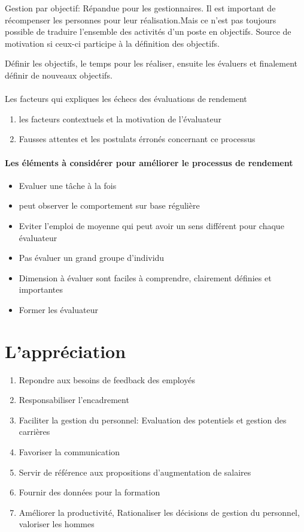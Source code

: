 
Gestion par objectif: Répandue pour les gestionnaires. Il est important de récompenser les personnes pour leur réalisation.Mais ce n'est pas toujours possible de traduire l'ensemble des activités d'un poste en objectifs. 
Source de motivation si ceux-ci participe à la définition des objectifs. 

Définir les objectifs, le temps pour les réaliser, ensuite les évaluers et finalement définir de nouveaux objectifs. 


\paragraph{}{Les facteurs qui expliques les échecs des évaluations de rendement}
\begin{enumerate}
    \item les facteurs contextuels et la motivation de l'évaluateur
    \item Fausses attentes et les postulats érronés concernant ce processus
\end{enumerate}

\paragraph{Les éléments à considérer pour améliorer le processus de rendement}
\begin{itemize}
    \item Evaluer une tâche à la fois
    \item peut observer le comportement sur base régulière
    \item Eviter l'emploi de moyenne qui peut avoir un sens différent pour chaque évaluateur
    \item Pas évaluer un grand groupe d'individu
    \item Dimension à évaluer sont faciles à comprendre, clairement définies et importantes
    \item Former les évaluateur
    
\end{itemize}


\section{L'appréciation} \cite{gestionressourceshumaine2007}


\begin{enumerate}
    \item Repondre aux besoins de feedback des employés
    \item Responsabiliser l'encadrement
    \item Faciliter la gestion du personnel: Evaluation des potentiels et gestion des carrières
    \item Favoriser la communication
    \item Servir de référence aux propositions d'augmentation de salaires
    \item Fournir des données pour la formation
    \item Améliorer la productivité, Rationaliser les décisions de gestion du personnel, valoriser les hommes
\end{enumerate} 

